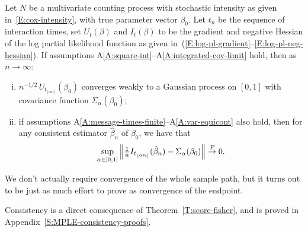 \documentclass[final]{statsoc}
\begin{document}
\begin{theorem}\label{T:score-fisher}
    Let $N$ be a multivariate counting process with stochastic
    intensity as given in~\eqref{E:cox-intensity}, with true parameter
    vector $\beta_0$.  Let $t_n$ be the sequence of interaction times,
    set $U_t(\beta)$ and $I_t(\beta)$ to
    be the gradient and negative Hessian of the log partial likelihood 
    function
    as given in~(\ref{E:log-pl-gradient}--\ref{E:log-pl-neg-hessian}).  If
    assumptions A\ref{A:square-int}--A\ref{A:integrated-cov-limit} hold, then
    as $n \to \infty$:
    \begin{enumerate}[(i)]
        \item \label{I:score-part}
        $n^{-1/2} \, U_{t_{\lfloor \alpha n \rfloor}}(\beta_0)$
        converges weakly to a Gaussian process on $[0,1]$ with
        covariance function $\Sigma_\alpha(\beta_0)$;

        \item \label{I:fisher-part}
        if assumptions
        A\ref{A:message-times-finite}--A\ref{A:var-equicont} also hold, then for any consistent
        estimator $\hat \beta_n$ of $\beta_0$,
        we have that
        \[
            \sup_{\alpha \in [0,1]}
            \left\|
                \tfrac{1}{n}
                I_{t_{\lfloor \alpha n \rfloor}}(\hat \beta_{n})
                -
                \Sigma_\alpha(\beta_0)
            \right\|
            \overset{\mathit{P}}{\to}
            0.
        \]
    \end{enumerate}
\end{theorem}

\noindent
We don't actually require convergence of the whole sample path, but
it turns out to be just as much effort to prove as convergence of the
endpoint.

Consistency is a direct consequence of Theorem~\ref{T:score-fisher},
and is proved in Appendix~\ref{S:MPLE-consistency-proofs}.
\end{document}
